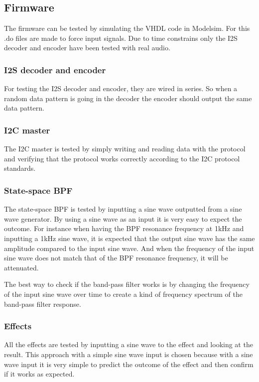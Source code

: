 \subsection{Firmware}
The firmware can be tested by simulating the VHDL code in Modelsim. For this .do files are made to force input signals. Due to time constrains only the I2S decoder and encoder have been tested with real audio. 

\subsubsection{I2S decoder and encoder}
For testing the I2S decoder and encoder, they are wired in series. So when a random data pattern is going in the decoder the encoder should output the same data pattern.

\subsubsection{I2C master}
The I2C master is tested by simply writing and reading data with the protocol and verifying that the protocol works correctly according to the I2C protocol standards. 

\subsubsection{State-space BPF}
The state-space BPF is tested by inputting a sine wave outputted from a sine wave generator. By using a sine wave as an input it is very easy to expect the outcome. For instance when having the BPF resonance frequency at 1kHz and inputting a 1kHz sine wave, it is expected that the output sine wave has the same amplitude compared to the input sine wave. And when the frequency of the input sine wave does not match that of the BPF resonance frequency, it will be attenuated. 

The best way to check if the band-pass filter works is by changing the frequency of the input sine wave over time to create a kind of frequency spectrum of the band-pass filter response. 

\subsubsection{Effects}
All the effects are tested by inputting a sine wave to the effect and looking at the result. This approach with a simple sine wave input is chosen because with a sine wave input it is very simple to predict the outcome of the effect and then confirm if it works as expected.


